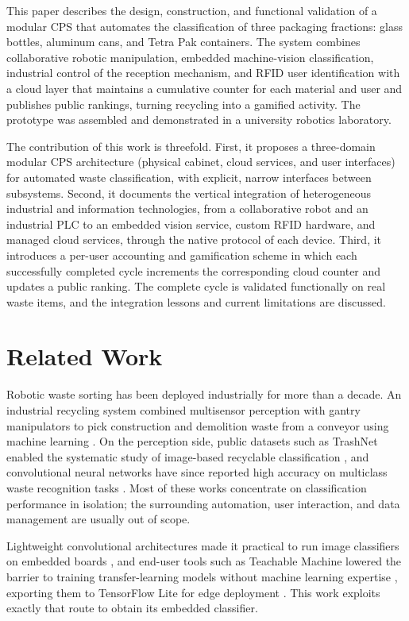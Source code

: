 ﻿\documentclass[conference]{IEEEtran}
\begin{document}
This paper describes the design, construction, and functional validation of a modular CPS that automates the classification of three packaging fractions: glass bottles, aluminum cans, and Tetra Pak containers. The system combines collaborative robotic manipulation, embedded machine-vision classification, industrial control of the reception mechanism, and RFID user identification with a cloud layer that maintains a cumulative counter for each material and user and publishes public rankings, turning recycling into a gamified activity. The prototype was assembled and demonstrated in a university robotics laboratory.

The contribution of this work is threefold. First, it proposes a three-domain modular CPS architecture (physical cabinet, cloud services, and user interfaces) for automated waste classification, with explicit, narrow interfaces between subsystems. Second, it documents the vertical integration of heterogeneous industrial and information technologies, from a collaborative robot and an industrial PLC to an embedded vision service, custom RFID hardware, and managed cloud services, through the native protocol of each device. Third, it introduces a per-user accounting and gamification scheme in which each successfully completed cycle increments the corresponding cloud counter and updates a public ranking. The complete cycle is validated functionally on real waste items, and the integration lessons and current limitations are discussed.

\section{Related Work}
Robotic waste sorting has been deployed industrially for more than a decade. An industrial recycling system combined multisensor perception with gantry manipulators to pick construction and demolition waste from a conveyor using machine learning \cite{b4}. On the perception side, public datasets such as TrashNet enabled the systematic study of image-based recyclable classification \cite{b5}, and convolutional neural networks have since reported high accuracy on multiclass waste recognition tasks \cite{b6}. Most of these works concentrate on classification performance in isolation; the surrounding automation, user interaction, and data management are usually out of scope.

Lightweight convolutional architectures made it practical to run image classifiers on embedded boards \cite{b7}, and end-user tools such as Teachable Machine lowered the barrier to training transfer-learning models without machine learning expertise \cite{b8}, exporting them to TensorFlow Lite for edge deployment \cite{b9}. This work exploits exactly that route to obtain its embedded classifier.
\end{document}
